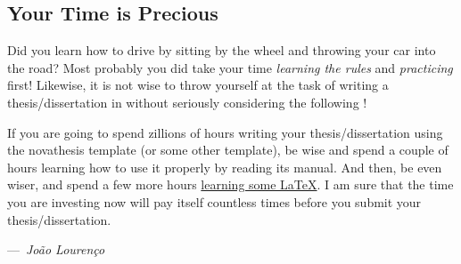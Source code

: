 %
%
%
%
    
\subsection{Your Time is Precious}
\label{sub:time_is_money}

Did you learn how to drive by sitting by the wheel and throwing your car into the road?  Most probably you did take your time \emph{learning the rules} and \emph{practicing} first! Likewise, it is not wise to throw yourself at the task of writing a thesis/dissertation in  without seriously considering the following !

\begin{tcolorbox}[colback=green!8]
  If you are going to spend zillions of hours writing your thesis/dissertation using the \gls{novathesis}  template (or some other  template), be wise and spend a couple of hours learning how to use it properly by reading its manual.  And then, be even wiser, and spend a few more hours \href{https://github.com/joaomlourenco/novathesis/wiki\#learning-latex}{learning some \LaTeX}.  I am sure that the time you are investing now will pay itself countless times before you submit your thesis/dissertation.\\\parbox{\linewidth}{\raggedleft---~\emph{João Lourenço}}
\end{tcolorbox}

